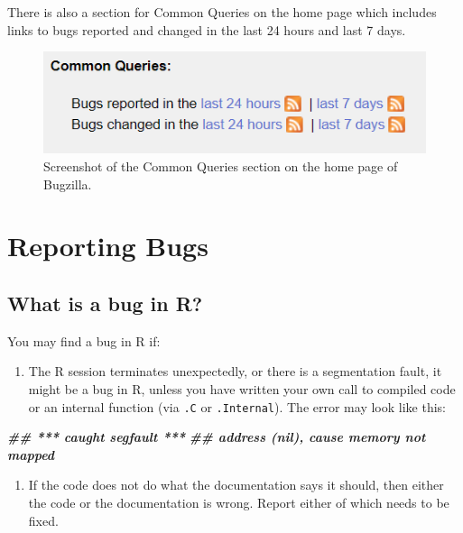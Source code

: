 \documentclass[
]{book}
\newenvironment{Shaded}{\begin{snugshade}}{\end{snugshade}}
\newcommand{\DocumentationTok}[1]{\textcolor[rgb]{0.56,0.35,0.01}{\textbf{\textit{#1}}}}
\providecommand{\tightlist}{%
  \setlength{\itemsep}{0pt}\setlength{\parskip}{0pt}}
\begin{document}
There is also a section for Common Queries on the home page which includes links to bugs reported and changed in the last 24 hours and last 7 days.

\begin{figure}
\centering
\includegraphics{img/commonquery.png}
\caption{Screenshot of the Common Queries section on the home page of Bugzilla.}
\end{figure}

\hypertarget{ReportingBugs}{%
\chapter{Reporting Bugs}\label{ReportingBugs}}

\hypertarget{what-is-a-bug-in-r}{%
\section{What is a bug in R?}\label{what-is-a-bug-in-r}}

You may find a bug in R if:

\begin{enumerate}
\def\labelenumi{\arabic{enumi}.}
\tightlist
\item
  The R session terminates unexpectedly, or there is a segmentation fault, it might be a bug in R, unless you have written your own call to compiled code or an internal function (via \texttt{.C} or \texttt{.Internal}). The error may look like this:
\end{enumerate}

\begin{Shaded}
\begin{Highlighting}[]
\DocumentationTok{\#\#  *** caught segfault ***}
\DocumentationTok{\#\# address (nil), cause \textquotesingle{}memory not mapped\textquotesingle{}}
\end{Highlighting}
\end{Shaded}

\begin{enumerate}
\def\labelenumi{\arabic{enumi}.}
\setcounter{enumi}{1}
\tightlist
\item
  If the code does not do what the documentation says it should, then either the code or the documentation is wrong. Report either of which needs to be fixed.
\end{enumerate}
\end{document}
